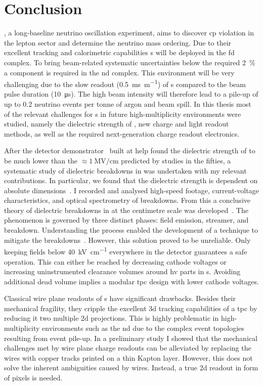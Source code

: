 \chapter{Conclusion}
\label{chap:conclusion}

\dune{}, a long-baseline neutrino oscillation experiment, aims to discover \gls{cp} violation in the lepton sector and determine the neutrino mass ordering.
Due to their excellent tracking and calorimetric capabilities \lartpc{}s will be deployed in the \gls{fd} complex.
To bring beam-related systematic uncertainties below the required \SI{2}{\percent} a \lartpc{} component is required in the \gls{nd} complex.
This environment will be very challenging due to the slow readout (\SI{0.5}{\milli\second\per\metre}) of \lartpc{}s compared to the beam pulse duration (\SI{10}{\micro\second}).
The high beam intensity will therefore lead to a pile-up of up to \num{0.2} neutrino events per tonne of argon and beam spill.
In this thesis most of the relevant challenges for \lartpc{}s in future high-multiplicity environments were studied, namely the dielectric strength of \lar{}, new charge and light readout methods, as well as the required next-generation charge readout electronics.

After the \AT{} detector demonstrator~\cite{AT} built at \gls{help} found the dielectric strength of \lar{} to be much lower than the $\approx \SI{1}{\mega\volt\per\centi\metre}$ predicted by studies in the fifties, a systematic study of dielectric breakdowns in \lar{} was undertaken with my relevant contributions.
In particular, we found that the dielectric strength is dependent on absolute dimensions~\cite{breakdown_14}.
I recorded and analysed high-speed footage, current-voltage characteristics, and optical spectrometry of breakdowns.
From this a conclusive theory of dielectric breakdowns in \lar{} at the centimetre scale was developed~\cite{breakdown_16}.
The phenomenon is governed by three distinct phases: field emission, streamer, and breakdown.
Understanding the process enabled the development of a technique to mitigate the breakdowns~\cite{latex}.
However, this solution proved to be unreliable.
Only keeping fields below \SI{40}{\kilo\volt\per\centi\metre} everywhere in the detector guarantees a safe operation.
This can either be reached by decreasing cathode voltages or increasing uninstrumented clearance volumes around \gls{hv} parts in \lartpc{}s.
Avoiding additional dead \lar{} volume implies a modular \gls{tpc} design with lower cathode voltages.

Classical wire plane readouts of \lartpc{}s have significant drawbacks.
Besides their mechanical fragility, they cripple the excellent \gls{3d} tracking capabilities of a \gls{tpc} by reducing it two multiple \gls{2d} projections.
This is highly problematic in high-multiplicity environments such as the \dune{} \gls{nd} due to the complex event topologies resulting from event pile-up.
In a preliminary study I showed that the mechanical challenges met by wire plane charge readouts can be alleviated by replacing the wires with copper tracks printed on a thin Kapton layer.
However, this does not solve the inherent ambiguities caused by wires.
Instead, a true \gls{2d} readout in form of pixels is needed.

